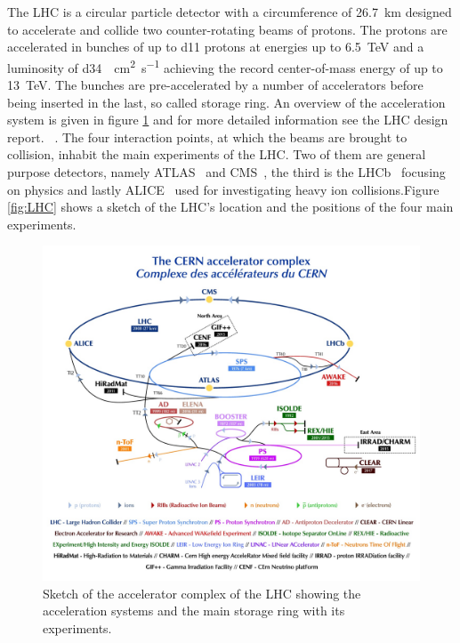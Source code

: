 The LHC is a circular particle detector with a circumference of \SI{26.7}{\kilo \metre} designed to  accelerate and collide two counter-rotating beams of protons. The protons are accelerated in bunches of up to \num{d11} protons at  energies up to \SI{6.5}{\tera \electronvolt} and a luminosity of \SI{d34}{\per\square\cm \per\s} achieving the record center-of-mass energy of up to \SI{13}{\tera \electronvolt}. The bunches are pre-accelerated by a number of accelerators before being inserted in the last, so called storage ring. An overview of the acceleration system is given in figure \ref{fig:accelerator_complex} and for more detailed information see the LHC design report. ~\cite{lhc_machine}. 
The four interaction points, at which the beams are brought to collision, inhabit the main experiments of the LHC. Two of them are general purpose detectors, namely ATLAS~\cite{atlas} and CMS~\cite{cms}, the third is the LHCb~\cite{lhcb} focusing on \Pbottom physics and lastly ALICE~\cite{alice} used for investigating heavy ion collisions.Figure \ref{fig:LHC} shows a sketch of the LHC's location and the positions of the four main experiments.

\begin{figure}[htbp]
\centering
\includegraphics[width=\figwidth]{figures_LHC/CCC-v2018-print-v2.jpg}
\caption[Sketch of the LHC accelerator complex]{Sketch of the accelerator complex of the LHC showing the acceleration systems and the main storage ring with its experiments.~\cite{Mobs:2636343}}
\label{fig:accelerator_complex}
\end{figure}

